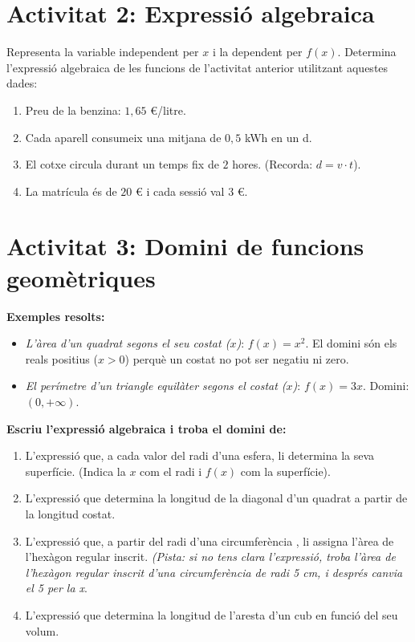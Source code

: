 \documentclass[12pt,a4paper]{article}
\begin{document}
\vspace{0.4cm}

\section*{Activitat 2: Expressió algebraica}

Representa la variable independent per $x$ i la dependent per $f(x)$. Determina l'expressió algebraica de les funcions de l'activitat anterior utilitzant aquestes dades:
\begin{enumerate}[label=\alph*)]
    \item Preu de la benzina: $1,65$ \euro/litre.
    \item Cada aparell consumeix una mitjana de $0,5$ kWh en un d.
    \item El cotxe circula durant un temps fix de $2$ hores. (Recorda: $d = v \cdot t$).
    \item La matrícula és de $20$ € i cada sessió val $3$ €.
\end{enumerate}

\vspace{0.4cm}

\section*{Activitat 3: Domini de funcions geomètriques}

\textbf{Exemples resolts:}
\begin{itemize}
    \item \textit{L'àrea d'un quadrat segons el seu costat ($x$)}: $f(x) = x^2$. El domini són els reals positius ($x > 0$) perquè un costat no pot ser negatiu ni zero.
    \item \textit{El perímetre d'un triangle equilàter segons el costat ($x$)}: $f(x) = 3x$. Domini: $(0, +\infty)$.
\end{itemize}

\textbf{Escriu l'expressió algebraica i troba el domini de:}
\begin{enumerate}[label=\alph*)]
    \item L'expressió que, a cada valor del radi d'una esfera, li determina la seva superfície. (Indica la $x$ com el radi i $f(x)$ com la superfície).
    \item L'expressió que determina la longitud de la diagonal d'un quadrat a partir de la longitud costat.
    \item L'expressió que, a partir del radi d'una circumferència , li assigna l'àrea de l'hexàgon regular inscrit. \textit{(Pista: si no tens clara l'expressió, troba l'àrea de l'hexàgon regular inscrit d'una circumferència de radi 5 cm, i després canvia el 5 per la x}.
    \item L'expressió que determina la longitud de l'aresta d'un cub en funció del seu volum.
\end{enumerate}
\end{document}

